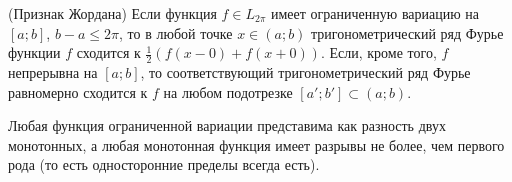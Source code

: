 \begin{theorem} (Признак Жордана)
	Если функция $f \in L_{2\pi}$ имеет ограниченную вариацию на $[a; b]$, $b - a \le 2\pi$, то в любой точке $x \in (a; b)$ тригонометрический ряд Фурье функции $f$ сходится к $\frac{1}{2}(f(x - 0) + f(x + 0))$. Если, кроме того, $f$ непрерывна на $[a; b]$, то соответствующий тригонометрический ряд Фурье равномерно сходится к $f$ на любом подотрезке $[a'; b'] \subset (a; b)$.
\end{theorem}

\begin{reminder}
	Любая функция ограниченной вариации представима как разность двух монотонных, а любая монотонная функция имеет разрывы не более, чем первого рода (то есть односторонние пределы всегда есть).
\end{reminder}

